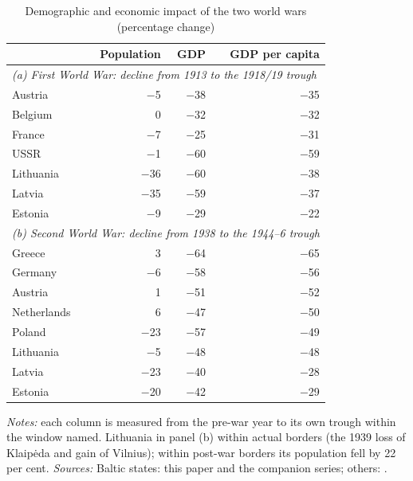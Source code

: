 \begin{table}[htbp]
\centering\small
\caption{Demographic and economic impact of the two world wars (percentage change)}
\label{tab:war}
\begin{threeparttable}
\begin{tabular}{lrrr}
\toprule
& Population & GDP & GDP per capita \\
\midrule
\multicolumn{4}{l}{\textit{(a) First World War: decline from 1913 to the 1918/19 trough}} \\
Austria & $-$5 & $-$38 & $-$35 \\
Belgium & 0 & $-$32 & $-$32 \\
France & $-$7 & $-$25 & $-$31 \\
USSR & $-$1 & $-$60 & $-$59 \\
Lithuania & $-$36 & $-$60 & $-$38 \\
Latvia & $-$35 & $-$59 & $-$37 \\
Estonia & $-$9 & $-$29 & $-$22 \\
\midrule
\multicolumn{4}{l}{\textit{(b) Second World War: decline from 1938 to the 1944--6 trough}} \\
Greece & 3 & $-$64 & $-$65 \\
Germany & $-$6 & $-$58 & $-$56 \\
Austria & 1 & $-$51 & $-$52 \\
Netherlands & 6 & $-$47 & $-$50 \\
Poland & $-$23 & $-$57 & $-$49 \\
Lithuania & $-$5 & $-$48 & $-$48 \\
Latvia & $-$23 & $-$40 & $-$28 \\
Estonia & $-$20 & $-$42 & $-$29 \\
\bottomrule
\end{tabular}
\begin{tablenotes}
\footnotesize
\textit{Notes:} each column is measured from the pre-war year to its own trough within the window named. Lithuania in panel (b) within actual borders (the 1939 loss of Klaip\.{e}da and gain of Vilnius); within post-war borders its population fell by 22 per cent. \textit{Sources:} Baltic states: this paper and the companion series; others: \textcite{mpd2023}.
\end{tablenotes}
\end{threeparttable}
\end{table}
